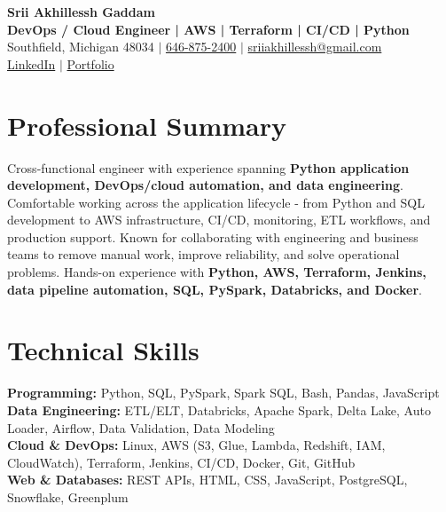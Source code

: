 \documentclass[letterpaper,10pt]{article}
\begin{document}
\fontsize{9.35pt}{10.45pt}\selectfont

\begin{center}
    {\LARGE \textbf{Srii Akhillessh Gaddam}} \\[-1pt]
    \textbf{DevOps / Cloud Engineer | AWS | Terraform | CI/CD | Python} \\[2pt]
    Southfield, Michigan 48034 $|$
    \href{tel:6468752400}{646-875-2400} $|$
    \href{mailto:sriiakhillessh@gmail.com}{sriiakhillessh@gmail.com} \\[1pt]
    \href{https://www.linkedin.com/in/srii-akhiilessh-gaddam-b48668191/}{LinkedIn} $|$
    \href{https://sriiakhillesshg.github.io/portfolio/}{Portfolio}
\end{center}
\vspace{-8pt}

\section{Professional Summary}
\small{Cross-functional engineer with experience spanning \textbf{Python application development, DevOps/cloud automation, and data engineering}. Comfortable working across the application lifecycle - from Python and SQL development to AWS infrastructure, CI/CD, monitoring, ETL workflows, and production support. Known for collaborating with engineering and business teams to remove manual work, improve reliability, and solve operational problems. Hands-on experience with \textbf{Python, AWS, Terraform, Jenkins, data pipeline automation, SQL, PySpark, Databricks, and Docker}.}

\section{Technical Skills}
\small{
\textbf{Programming:} Python, SQL, PySpark, Spark SQL, Bash, Pandas, JavaScript \\
\textbf{Data Engineering:} ETL/ELT, Databricks, Apache Spark, Delta Lake, Auto Loader, Airflow, Data Validation, Data Modeling \\
\textbf{Cloud \& DevOps:} Linux, AWS (S3, Glue, Lambda, Redshift, IAM, CloudWatch), Terraform, Jenkins, CI/CD, Docker, Git, GitHub \\
\textbf{Web \& Databases:} REST APIs, HTML, CSS, JavaScript, PostgreSQL, Snowflake, Greenplum
}
\end{document}
